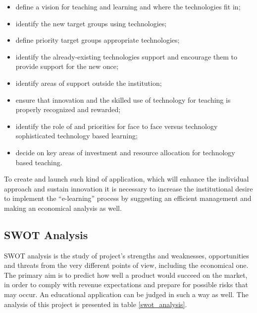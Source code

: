 \begin{itemize}
  \setlength{\itemsep}{2pt}
  \setlength{\parskip}{1pt}  
  \item define a vision for teaching and learning and where the technologies fit in;
  \item identify the new target groups using technologies;
  \item define priority target groups appropriate technologies;
  \item identify the already-existing technologies support and encourage them to provide support for the new once;
  \item identify areas of support outside the institution;
  \item ensure that innovation and the skilled use of technology for teaching is properly recognized and rewarded;
  \item identify the role of and priorities for face to face versus technology sophisticated technology     based learning;
  \item decide on key areas of investment and resource allocation for technology based teaching.
\end{itemize}

To create and launch such kind of application, which will enhance the individual approach and sustain innovation it is necessary to increase the institutional desire to implement the “e-learning” process by suggesting an efficient management and making an economical analysis as well.

\subsection{SWOT Analysis}
SWOT analysis is the study of project’s strengths and weaknesses, opportunities and threats from the very different points of view, including the economical one. The primary aim is to predict how well a product would succeed on the market, in order to comply with revenue expectations and prepare for possible risks that may occur. An educational application can be judged in such a way as well. The analysis of this project is presented in table \ref{swot_analysis}.

